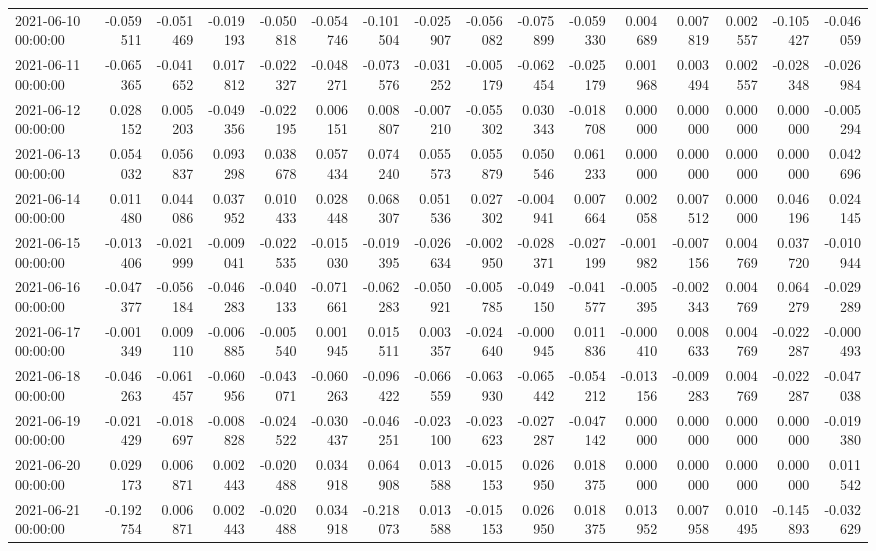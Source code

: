 \begin{tabular}{lrrrrrrrrrrrrrrr}
2021-06-10 00:00:00 & -0.059511 & -0.051469 & -0.019193 & -0.050818 & -0.054746 & -0.101504 & -0.025907 & -0.056082 & -0.075899 & -0.059330 & 0.004689 & 0.007819 & 0.002557 & -0.105427 & -0.046059 \\
2021-06-11 00:00:00 & -0.065365 & -0.041652 & 0.017812 & -0.022327 & -0.048271 & -0.073576 & -0.031252 & -0.005179 & -0.062454 & -0.025179 & 0.001968 & 0.003494 & 0.002557 & -0.028348 & -0.026984 \\
2021-06-12 00:00:00 & 0.028152 & 0.005203 & -0.049356 & -0.022195 & 0.006151 & 0.008807 & -0.007210 & -0.055302 & 0.030343 & -0.018708 & 0.000000 & 0.000000 & 0.000000 & 0.000000 & -0.005294 \\
2021-06-13 00:00:00 & 0.054032 & 0.056837 & 0.093298 & 0.038678 & 0.057434 & 0.074240 & 0.055573 & 0.055879 & 0.050546 & 0.061233 & 0.000000 & 0.000000 & 0.000000 & 0.000000 & 0.042696 \\
2021-06-14 00:00:00 & 0.011480 & 0.044086 & 0.037952 & 0.010433 & 0.028448 & 0.068307 & 0.051536 & 0.027302 & -0.004941 & 0.007664 & 0.002058 & 0.007512 & 0.000000 & 0.046196 & 0.024145 \\
2021-06-15 00:00:00 & -0.013406 & -0.021999 & -0.009041 & -0.022535 & -0.015030 & -0.019395 & -0.026634 & -0.002950 & -0.028371 & -0.027199 & -0.001982 & -0.007156 & 0.004769 & 0.037720 & -0.010944 \\
2021-06-16 00:00:00 & -0.047377 & -0.056184 & -0.046283 & -0.040133 & -0.071661 & -0.062283 & -0.050921 & -0.005785 & -0.049150 & -0.041577 & -0.005395 & -0.002343 & 0.004769 & 0.064279 & -0.029289 \\
2021-06-17 00:00:00 & -0.001349 & 0.009110 & -0.006885 & -0.005540 & 0.001945 & 0.015511 & 0.003357 & -0.024640 & -0.000945 & 0.011836 & -0.000410 & 0.008633 & 0.004769 & -0.022287 & -0.000493 \\
2021-06-18 00:00:00 & -0.046263 & -0.061457 & -0.060956 & -0.043071 & -0.060263 & -0.096422 & -0.066559 & -0.063930 & -0.065442 & -0.054212 & -0.013156 & -0.009283 & 0.004769 & -0.022287 & -0.047038 \\
2021-06-19 00:00:00 & -0.021429 & -0.018697 & -0.008828 & -0.024522 & -0.030437 & -0.046251 & -0.023100 & -0.023623 & -0.027287 & -0.047142 & 0.000000 & 0.000000 & 0.000000 & 0.000000 & -0.019380 \\
2021-06-20 00:00:00 & 0.029173 & 0.006871 & 0.002443 & -0.020488 & 0.034918 & 0.064908 & 0.013588 & -0.015153 & 0.026950 & 0.018375 & 0.000000 & 0.000000 & 0.000000 & 0.000000 & 0.011542 \\
2021-06-21 00:00:00 & -0.192754 & 0.006871 & 0.002443 & -0.020488 & 0.034918 & -0.218073 & 0.013588 & -0.015153 & 0.026950 & 0.018375 & 0.013952 & 0.007958 & 0.010495 & -0.145893 & -0.032629 \\

\end{tabular}
